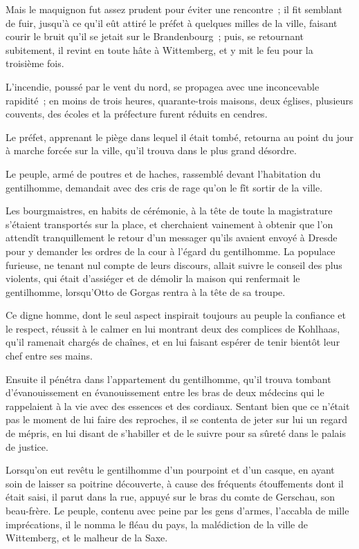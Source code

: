 \documentclass[french,twoside]{book} %
\begin{document}
Mais le maquignon fut assez prudent pour éviter une rencontre ; il fit semblant de fuir, jusqu’à ce qu’il eût attiré le préfet à quelques milles de la ville, faisant courir le bruit qu’il se jetait sur le Brandenbourg ; puis, se retournant subitement, il revint en toute hâte à Wittemberg, et y mit le feu pour la troisième fois.\par
L’incendie, poussé par le vent du nord, se propagea avec une inconcevable rapidité ; en moins de trois heures, quarante-trois maisons, deux églises, plusieurs couvents, des écoles et la préfecture furent réduits en cendres.\par
Le préfet, apprenant le piège dans lequel il était tombé, retourna au point du jour à marche forcée sur la ville, qu’il trouva dans le plus grand désordre.\par
Le peuple, armé de poutres et de haches, rassemblé devant l’habitation du gentilhomme, demandait avec des cris de rage qu’on le fît sortir de la ville.\par
Les bourgmaistres, en habits de cérémonie, à la tête de toute la magistrature s’étaient transportés sur la place, et cherchaient vainement à obtenir que l’on attendît tranquillement le retour d’un messager qu’ils avaient envoyé à Dresde pour y demander les ordres de la cour à l’égard du gentilhomme. La populace furieuse, ne tenant nul compte de leurs discours, allait suivre le conseil des plus violents, qui était d’assiéger et de démolir la maison qui renfermait le gentilhomme, lorsqu’Otto de Gorgas rentra à la tête de sa troupe.\par
Ce digne homme, dont le seul aspect inspirait toujours au peuple la confiance et le respect, réussit à le calmer en lui montrant deux des complices de Kohlhaas, qu’il ramenait chargés de chaînes, et en lui faisant espérer de tenir bientôt leur chef entre ses mains.\par
Ensuite il pénétra dans l’appartement du gentilhomme, qu’il trouva tombant d’évanouissement en évanouissement entre les bras de deux médecins qui le rappelaient à la vie avec des essences et des cordiaux. Sentant bien que ce n’était pas le moment de lui faire des reproches, il se contenta de jeter sur lui un regard de mépris, en lui disant de s’habiller et de le suivre pour sa sûreté dans le palais de justice.\par
Lorsqu’on eut revêtu le gentilhomme d’un pourpoint et d’un casque, en ayant soin de laisser sa poitrine découverte, à cause des fréquents étouffements dont il était saisi, il parut dans la rue, appuyé sur le bras du comte de Gerschau, son beau-frère. Le peuple, contenu avec peine par les gens d’armes, l’accabla de mille imprécations, il le nomma le fléau du pays, la malédiction de la ville de Wittemberg, et le malheur de la Saxe.\par
\end{document}

